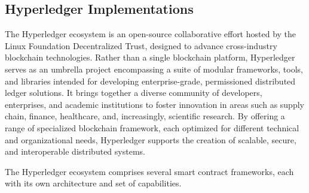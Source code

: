 \documentclass[final]{rc-book-2.14}
\begin{document}
\subsection{Hyperledger Implementations}

The Hyperledger ecosystem is an open-source collaborative effort hosted by the Linux Foundation Decentralized Trust, designed to advance cross-industry blockchain technologies. Rather than a single blockchain platform, Hyperledger serves as an umbrella project encompassing a suite of modular frameworks, tools, and libraries intended for developing enterprise-grade, permissioned distributed ledger solutions. It brings together a diverse community of developers, enterprises, and academic institutions to foster innovation in areas such as supply chain, finance, healthcare, and, increasingly, scientific research. By offering a range of specialized blockchain framework, each optimized for different technical and organizational needs, Hyperledger supports the creation of scalable, secure, and interoperable distributed systems.

The Hyperledger ecosystem comprises several smart contract frameworks, each with its own architecture and set of capabilities.
\end{document}
